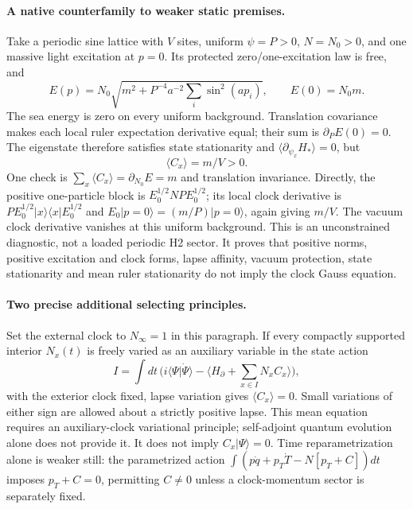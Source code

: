 \documentclass[10pt]{article}
\begin{document}
\paragraph{A native counterfamily to weaker static premises.}
Take a periodic sine lattice with $V$ sites, uniform
$\psi=P>0$, $N=N_0>0$, and one massive light excitation at $p=0$.
Its protected zero/one-excitation law is free, and
\[
 E(p)=N_0\sqrt{m^2+P^{-4}a^{-2}\sum_i\sin^2(ap_i)},
 \qquad E(0)=N_0m.
\]
The sea energy is zero on every uniform background. Translation
covariance makes each local ruler expectation derivative equal;
their sum is $\partial_PE(0)=0$. The eigenstate therefore satisfies
state stationarity and $\langle\partial_{\psi_x}H_*\rangle=0$,
but
\begin{equation}
 \langle C_x\rangle=m/V>0.\label{eq:fg-counter}
\end{equation}
One check is $\sum_x\langle C_x\rangle=\partial_{N_0}E=m$
and translation invariance. Directly, the positive one-particle
block is $E_0^{1/2}NPE_0^{1/2}$; its local clock derivative is
$PE_0^{1/2}|x\rangle\langle x|E_0^{1/2}$ and
$E_0|p=0\rangle=(m/P)|p=0\rangle$, again giving $m/V$.
The vacuum clock derivative vanishes at this uniform background.
This is an unconstrained diagnostic, not a loaded periodic H2
sector. It proves that positive norms, positive excitation and
clock forms, lapse affinity, vacuum protection, state stationarity
and mean ruler stationarity do not imply the clock Gauss equation.

\paragraph{Two precise additional selecting principles.}
Set the external clock to $N_\infty=1$ in this paragraph.
If every compactly supported interior $N_x(t)$ is freely varied
as an auxiliary variable in the state action
\[
 I=\int dt\,\bigl(i\langle\Psi|\dot\Psi\rangle
       -\langle H_\partial+\sum_{x\in I}N_xC_x\rangle\bigr),
\]
with the exterior clock fixed, lapse variation gives
$\langle C_x\rangle=0$. Small variations of either sign are
allowed about a strictly positive lapse. This mean equation
requires an auxiliary-clock variational principle; self-adjoint
quantum evolution alone does not provide it. It does not imply
$C_x|\Psi\rangle=0$. Time reparametrization alone is weaker still:
the parametrized action
$\int(p\dot q+p_T\dot T-N[p_T+C])dt$ imposes $p_T+C=0$, permitting
$C\ne0$ unless a clock-momentum sector is separately fixed.
\end{document}
